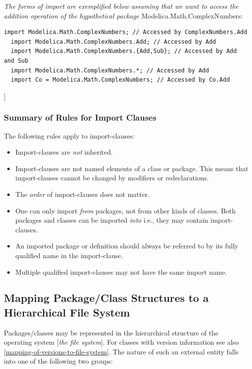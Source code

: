 \documentclass[10pt,a4paper]{report}
\def\doublelabel#1{\label{#1}}
\begin{document}
\emph{The forms of import are exemplified below assuming that we want to
access the addition operation of the hypothetical package}
Modelica.Math.ComplexNumbers:

\begin{lstlisting}[language=modelica]
  import Modelica.Math.ComplexNumbers; // Accessed by ComplexNumbers.Add
  import Modelica.Math.ComplexNumbers.Add; // Accessed by Add
  import Modelica.Math.ComplexNumbers.{Add,Sub}; // Accessed by Add and Sub
  import Modelica.Math.ComplexNumbers.*; // Accessed by Add
  import Co = Modelica.Math.ComplexNumbers; // Accessed by Co.Add
\end{lstlisting}
{]}

\subsubsection{Summary of Rules for Import Clauses}\doublelabel{summary-of-rules-for-import-clauses}

The following rules apply to import-clauses:

\begin{itemize}
\item
  Import-clauses are \emph{not} inherited.
\item
  Import-clauses are not named elements of a class or package. This
  means that import-clauses cannot be changed by modifiers or
  redeclarations.
\item
  The \emph{order} of import-clauses does not matter.
\item
  One can only import \emph{from} packages, not from other kinds of
  classes. Both packages and classes can be imported \emph{into} i.e.,
  they may contain import-clauses.
\item
  An imported package or definition should always be referred to by its
  fully qualified name in the import-clause.
\item
  Multiple qualified import-clauses may not have the same import name.
\end{itemize}

\subsection{Mapping Package/Class Structures to a Hierarchical File System}\doublelabel{mapping-package-class-structures-to-a-hierarchical-file-system}

Packages/classes may be represented in the hierarchical structure of the
operating system {[}\emph{the file system}{]}. For classes with version
information see also \ref{mapping-of-versions-to-file-system}. The nature of such an external
entity falls into one of the following two groups:
\end{document}
